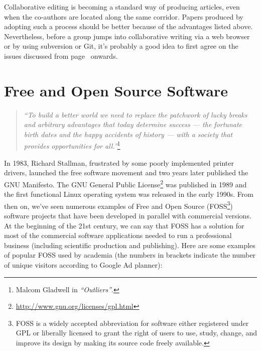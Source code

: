 \documentclass[graybox,envcountchap,sectrefs,UStrade]{svmono}
\begin{document}
Collaborative editing is becoming a standard way of producing articles, even when the co-authors are located along the same corridor. Papers produced by adopting such a process should be better because of the advantages listed above. Nevertheless, before a group jumps into collaborative writing via a web browser or by using \textsf{subversion} or \textsf{Git}, it's probably a good idea to first agree on the issues discussed from page~\pageref{sec:one_page_concept} onwards.\par


\section{Free and Open Source Software}

\begin{quote}
    \emph{``To build a better world we need to replace the patchwork of lucky breaks and arbitrary advantages that today determine success --- the fortunate birth dates and the happy accidents of history --- with a society that provides opportunities for all.''}\footnote{Malcom Gladwell in \emph{``Outliers''}.}
\end{quote}

In 1983, Richard Stallman, frustrated by some poorly implemented printer drivers, launched the free software movement and two years later published the GNU Manifesto. The GNU General Public License\footnote{\url{http://www.gnu.org/licenses/gpl.html}} was published in 1989 and the first functional Linux operating system was released in the early 1990s. From then on, we've seen numerous examples of Free and Open Source (FOSS\footnote{FOSS is a widely accepted abbreviation for software either registered under GPL or liberally licensed to grant the right of users to use, study, change, and improve its design by making its source code freely available.}) software projects that have been developed in parallel with commercial versions. At the beginning of the 21st century, we can say that FOSS has a solution for most of the commercial software applications needed to run a professional business (including scientific production and publishing). Here are some examples of popular FOSS used by academia (the numbers in brackets indicate the number of unique visitors according to \textsf{Google Ad planner}):
\end{document}
